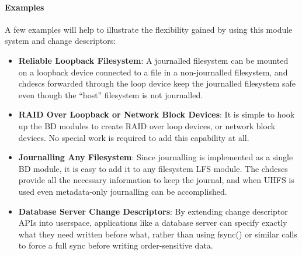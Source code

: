 \paragraph{Examples}
\label{sec:examples}

A few examples will help to illustrate the flexibility gained by using this
module system and change descriptors:

\begin{itemize}
\item \itemvspace{} {\bf Reliable Loopback Filesystem}: A journalled filesystem
  can be mounted on a loopback device connected to a file in a non-journalled
  filesystem, and chdescs forwarded through the loop device keep the journalled
  filesystem safe even though the ``host'' filesystem is not journalled.
\item \itemvspace{} {\bf RAID Over Loopback or Network Block Devices}: It is
  simple to hook up the BD modules to create RAID over loop devices, or network
  block devices. No special work is required to add this capability at all.
\item \itemvspace{} {\bf Journalling Any Filesystem}: Since journalling is
  implemented as a single BD module, it is easy to add it to any filesystem LFS
  module. The chdescs provide all the necessary information to keep the journal,
  and when UHFS is used even metadata-only journalling can be accomplished.
\item \itemvspace{} {\bf Database Server Change Descriptors}: By extending
  change descriptor APIs into userspace, applications like a database server can
  specify exactly what they need written before what, rather than using fsync()
  or similar calls to force a full sync before writing order-sensitive data.
\end{itemize}
\postlistspacing{}
